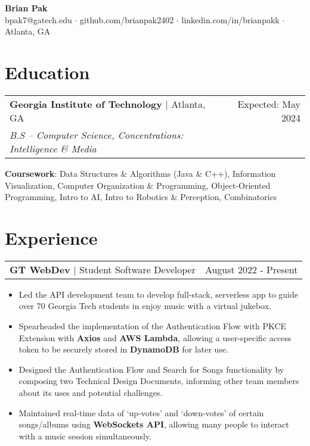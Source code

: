 \documentclass[letterpaper,11pt]{article}
\makeatletter
\newcommand{\resumeEducationHeading}[5]{
    \begin{tabular*}{0.99\textwidth}[t]{l@{\extracolsep{\fill}}r}
      \textbf{#1} $\vert$ #2 & #3 \\
      \textit{\small#4} & \textit{\small #5} \\
    \end{tabular*}\vspace{0.5pt}
}
\newcommand{\resumeExperienceHeading}[3]{
    \begin{tabular*}{0.99\textwidth}[t]{l@{\extracolsep{\fill}}r}
      \textbf{#1} $\vert$ {#2} & {#3} \\
    \end{tabular*}\vspace{-3pt}
}
\newcommand{\resumeItemListStart}{\begin{itemize}[noitemsep]\vspace{-4pt}}
\newcommand{\resumeItemListEnd}{\end{itemize}}
\makeatother
\begin{document}
\begin{center}
  \textbf{\huge Brian Pak} \\
  \vspace*{0.1cm}
  {bpak7@gatech.edu}  $\cdot$ {github.com/brianpak2402} $\cdot$ {linkedin.com/in/brianpakk}  $\cdot$ Atlanta, GA
\end{center}

\section{Education}
    \resumeEducationHeading
      {Georgia Institute of Technology}{Atlanta, GA}{Expected: May 2024}
      {B.S -- Computer Science, Concentrations: Intelligence \& Media}{\vspace{0.1cm}} 
    \textbf{Coursework}{: Data Structures \& Algorithms (Java \& C++), Information Visualization, Computer Organization \& Programming, Object-Oriented Programming, Intro to AI, Intro to Robotics \& Perception, Combinatorics} \\

\section{Experience}
  \resumeExperienceHeading{GT WebDev}{Student Software Developer}{August 2022 - Present}
    \resumeItemListStart
      \item {Led the API development team to develop full-stack, serverless app to guide over 70 Georgia Tech students in enjoy music with a virtual jukebox.}
      \item {Spearheaded the implementation of the Authentication Flow with PKCE Extension with \textbf{Axios} and \textbf{AWS Lambda}, allowing a user-specific access token to be securely stored in \textbf{DynamoDB} for later use.}
      \item {Designed the Authentication Flow and Search for Songs functionality by composing two Technical Design Documents, informing other team members about its uses and potential challenges.}
      \item {Maintained real-time data of `up-votes' and `down-votes' of certain songs/albums using \textbf{WebSockets API}, allowing many people to interact with a music session simultaneously.}
    \resumeItemListEnd
  
\end{document}
